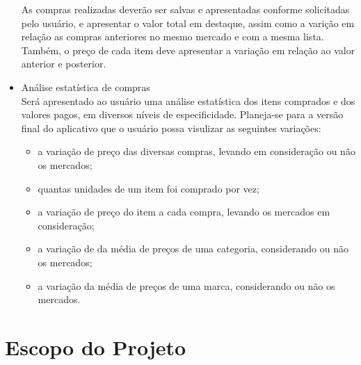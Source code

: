 \begin{itemize}
  As compras realizadas deverão ser salvas e apresentadas conforme
  solicitadas pelo usuário, e apresentar o valor total em destaque, assim como a
  varição em relação as compras anteriores no mesmo mercado e com a
  mesma lista. Também, o preço de cada item deve apresentar a variação
  em relação ao valor anterior e posterior.
\item Análise estatística de compras\\
  Será apresentado ao usuário uma análise estatística dos itens
  comprados e dos valores pagos, em diversos níveis de
  especificidade. Planeja-se para a versão final do aplicativo que o
  usuário possa visulizar as seguintes variações:
  \begin{itemize}
  \item a variação de preço das diversas compras, levando em
    consideração ou não os mercados;
  \item quantas unidades de um item foi comprado por vez;
  \item a variação de preço do item a cada compra, levando os mercados
    em consideração;
  \item a variação de da média de preços de uma categoria,
    considerando ou não os mercados;
  \item a variação da média de preços de uma marca, considerando ou
    não os mercados.
  \end{itemize}
\end{itemize}

\section{Escopo do Projeto}
